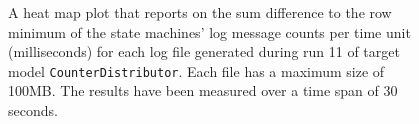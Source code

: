 \begin{figure}[htbp]
\centering
\begin{minipage}{1\textwidth}
  \centering
\end{minipage}
\caption{A heat map plot that reports on the sum difference to the row minimum of the state machines' log message counts per time unit (milliseconds) for each log file generated during run 11 of target model \texttt{CounterDistributor}. Each file has a maximum size of 100MB. The results have been measured over a time span of 30 seconds.}
\label{figure:throughput_difference_counterdistributor_11}
\end{figure}